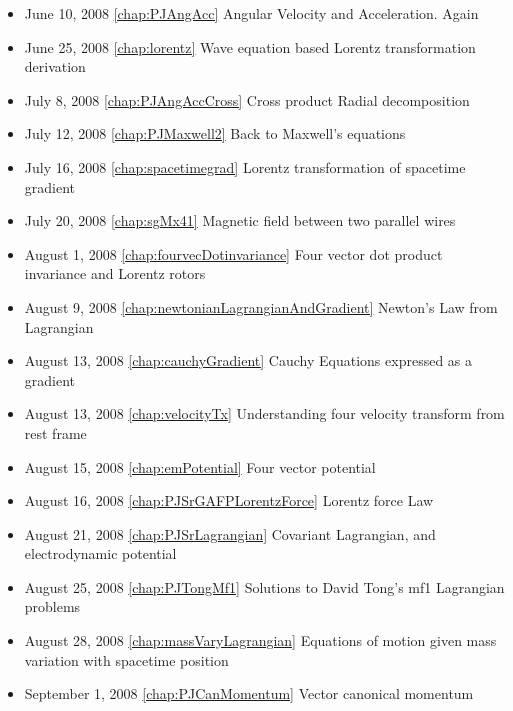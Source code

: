 \begin{itemize}
\item June 10, 2008 \ref{chap:PJAngAcc} Angular Velocity and Acceleration.  Again

\item June 25, 2008 \ref{chap:lorentz} Wave equation based Lorentz transformation derivation

\item July 8, 2008 \ref{chap:PJAngAccCross} Cross product Radial decomposition

\item July 12, 2008 \ref{chap:PJMaxwell2} Back to Maxwell's equations

\item July 16, 2008 \ref{chap:spacetimegrad} Lorentz transformation of spacetime gradient

\item July 20, 2008 \ref{chap:sgMx41} Magnetic field between two parallel wires

\item August 1, 2008 \ref{chap:fourvecDotinvariance} Four vector dot product invariance and Lorentz rotors

\item August 9, 2008 \ref{chap:newtonianLagrangianAndGradient} Newton's Law from Lagrangian

\item August 13, 2008 \ref{chap:cauchyGradient} Cauchy Equations expressed as a gradient

\item August 13, 2008 \ref{chap:velocityTx} Understanding four velocity transform from rest frame

\item August 15, 2008 \ref{chap:emPotential} Four vector potential

\item August 16, 2008 \ref{chap:PJSrGAFPLorentzForce} Lorentz force Law

\item August 21, 2008 \ref{chap:PJSrLagrangian} Covariant Lagrangian, and electrodynamic potential

\item August 25, 2008 \ref{chap:PJTongMf1} Solutions to David Tong's mf1 Lagrangian problems

\item August 28, 2008 \ref{chap:massVaryLagrangian} Equations of motion given mass variation with spacetime position

\item September 1, 2008 \ref{chap:PJCanMomentum} Vector canonical momentum


\end{itemize}
